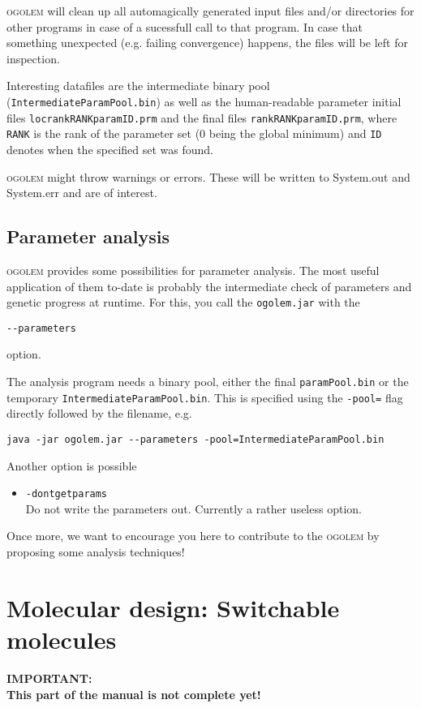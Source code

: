 \documentclass[a4paper,10pt]{scrbook}
\newcommand{\ogo}{\textsc{ogolem}}
\begin{document}
\ogo{} will clean up all automagically generated input files and/or directories
for other programs in case of a sucessfull call to that program. In case that
something unexpected (e.g. failing convergence) happens, the files will be left
for inspection.

Interesting datafiles are the intermediate binary pool
(\texttt{IntermediateParamPool.bin}) as well as the human-readable parameter
initial files \texttt{locrankRANKparamID.prm} and the final files
\texttt{rankRANKparamID.prm}, where \texttt{RANK} is the rank of the parameter
set (0 being the global minimum) and \texttt{ID} denotes when the specified set
was found.

\ogo{} might throw warnings or errors. These will be written to System.out and
System.err and are of interest.


\section{Parameter analysis}
\ogo{} provides some possibilities for parameter analysis. The most useful
application of them to-date is probably the intermediate check of parameters and
genetic progress at runtime. For this, you call the
\texttt{ogolem.jar} with the
\begin{verbatim}
--parameters
\end{verbatim}
option.

The analysis program needs a binary pool, either the final
\texttt{paramPool.bin}
or the temporary \texttt{IntermediateParamPool.bin}. This is specified using the
\texttt{-pool=} flag directly followed by the filename, e.g.
\begin{verbatim}
java -jar ogolem.jar --parameters -pool=IntermediateParamPool.bin
\end{verbatim}

Another option is possible
\begin{itemize}
  \item \texttt{-dontgetparams}\\
  Do not write the parameters out. Currently a rather useless option.
\end{itemize}

Once more, we want to encourage you here to contribute to the \ogo{} by
proposing some analysis techniques!

\chapter{Molecular design: Switchable molecules}
\textbf{IMPORTANT:\\
This part of the manual is not complete yet!}
\end{document}
